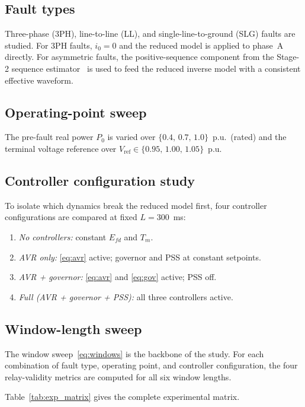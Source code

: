 \documentclass[journal,twoside,letterpaper]{IEEEtran}
\begin{document}
\subsection{Fault types}

Three-phase (3PH), line-to-line (LL), and single-line-to-ground
(SLG) faults are studied.
For 3PH faults, $i_0 = 0$ and the reduced model is applied
to phase~A directly.
For asymmetric faults, the positive-sequence component from
the Stage-2 sequence estimator~\cite{Eluvathingal2026_TR03} is
used to feed the reduced inverse model with a consistent
effective waveform.

\subsection{Operating-point sweep}

The pre-fault real power $P_0$ is varied over
$\{0.4,\,0.7,\,1.0\}$~p.u.\ (rated) and the terminal
voltage reference over $V_{\mathrm{ref}} \in \{0.95,\,1.00,\,1.05\}$~p.u.

\subsection{Controller configuration study}

To isolate which dynamics break the reduced model first,
four controller configurations are compared at fixed
$L = 300$~ms:
\begin{enumerate}
  \item \textit{No controllers:} constant $E_{fd}$ and $T_m$.
  \item \textit{AVR only:} \eqref{eq:avr} active; governor
    and PSS at constant setpoints.
  \item \textit{AVR + governor:} \eqref{eq:avr} and
    \eqref{eq:gov} active; PSS off.
  \item \textit{Full (AVR + governor + PSS):} all three
    controllers active.
\end{enumerate}

\subsection{Window-length sweep}

The window sweep~\eqref{eq:windows} is the backbone of
the study.
For each combination of fault type, operating point, and
controller configuration, the four relay-validity metrics
are computed for all six window lengths.

Table~\ref{tab:exp_matrix} gives the complete experimental
matrix.
\end{document}
